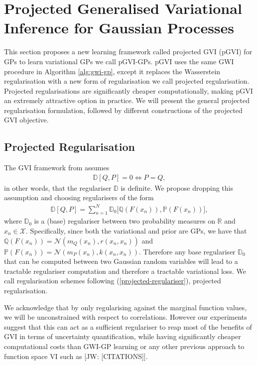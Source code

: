 \documentclass{article}
\newcommand{\jw}[1]{{\color{gray} [JW: #1]}}
\numberwithin{equation}{section}
\begin{document}
\newpage
\section{Projected Generalised Variational Inference for Gaussian Processes}\label{section:pgvi}
This section proposes a new learning framework called projected GVI (pGVI) for GPs to learn variational GPs we call pGVI-GPs.
pGVI uses the same GWI procedure in Algorithm \ref{alg:gwi-gp}, except it replaces the Wasserstein regularisation with a new form of regularisation we call projected regularisation.
Projected regularisations are significantly cheaper computationally, making pGVI an extremely attractive option in practice.
We will present the general projected regularisation formulation, followed by different constructions of the projected GVI objective.

\subsection{Projected Regularisation}
The GVI framework from \cite{knoblauch2022optimization} assumes
\begin{align}
    \mathbb{D}\left[Q, P\right] = 0 \Leftrightarrow P = Q,
\end{align}
in other words, that the regulariser $\mathbb{D}$ is definite.
We propose dropping this assumption and choosing regularisers of the form
\begin{align}
    \mathbb{D}\left[Q, P\right] = \sum_{{n}=1}^{N} \mathbb{D}_0 \Big[\mathbb{Q}\left(F(x_n)\right), \mathbb{P}\left(F(x_n)\right)\Big],
    \label{projected-regulariser}
\end{align}
where $\mathbb{D}_0$ is a (base) regulariser between two probability measures on $\mathbb{R}$ and $x_n \in \mathcal{X}$.
Specifically, since both the variational and prior are GPs, we have that $\mathbb{Q}\left(F(x_n)\right) = \mathcal{N}\left(m_Q(x_n), r(x_n, x_n)\right)$ and $\mathbb{P}\left(F(x_n)\right) = \mathcal{N}\left(m_P(x_n), k(x_n, x_n)\right)$.
Therefore any base regulariser $\mathbb{D}_0$ that can be computed between two Gaussian random variables will lead to a tractable regulariser computation and therefore a tractable variational loss. We call regularisation schemes following (\ref{projected-regulariser}), projected regularisation.

We acknowledge that by only regularising against the marginal function values, we will be unconstrained with respect to correlations.
However our experiments suggest that this can act as a  sufficient regulariser to reap most of the benefits of GVI in terms of uncertainty quantification, while having significantly cheaper computational costs than GWI-GP learning or any other previous approach to function space VI such as \jw{[CITATIONS]}.
\end{document}
